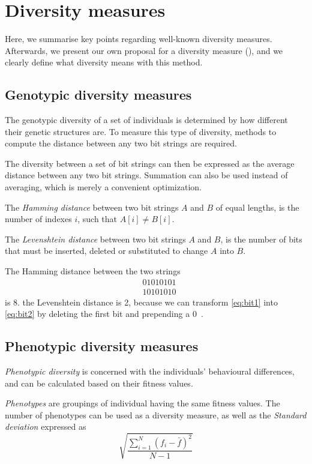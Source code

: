 \section{Diversity measures}

Here, we summarise key points regarding well-known diversity measures. Afterwards, we present our own proposal for a diversity measure (\dia), and we clearly define what diversity means with this method.

\subsection{Genotypic diversity measures}
The genotypic diversity of a set of individuals is determined by how different their genetic structures are. To measure this type of diversity, methods to compute the distance between any two bit strings are required.

The diversity between a set of bit strings can then be expressed as the average distance between any two bit strings. Summation can also be used instead of averaging, which is merely a convenient optimization.

The \emph{Hamming distance} between two bit strings $A$ and $B$ of equal lengths, is the number of indexes $i$, such that $A[i] \neq B[i]$.

The \emph{Levenshtein distance} between two bit strings $A$ and $B$, is the number of bits that must be inserted, deleted or substituted to change $A$ into $B$.

The Hamming distance between the two strings
%
\begin{align}
&01010101\label{eq:bit1} \\
&10101010\label{eq:bit2}
\end{align}
%
is 8. the Levenshtein distance is 2, because we can transform \cref{eq:bit1} into \cref{eq:bit2} by deleting the first bit and prepending a $0$~\cite{1250187}.

\subsection{Phenotypic diversity measures}
\emph{Phenotypic diversity} is concerned with the individuals' behavioural differences, and can be calculated based on their fitness values.

\emph{Phenotypes} are groupings of individual having the same fitness values. 
The number of phenotypes can be used as a diversity measure, as well as the \emph{Standard deviation} expressed as
%
\[\sqrt{\frac{\sum_{i=1}^N{(f_i-\bar{f})^2}}{N-1}}\]
%

